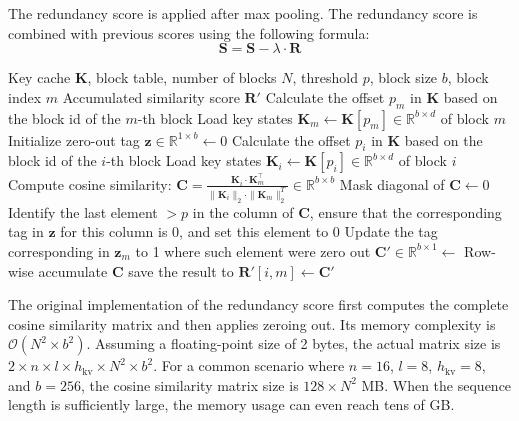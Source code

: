 \documentclass[11pt]{article}
\begin{document}
The redundancy score is applied after max pooling. The redundancy score is combined with previous scores using the following formula:
\begin{equation}
    \mathbf S=\mathbf{S} - \lambda \cdot\mathbf R
\end{equation}



\begin{algorithm}[!ht]
\caption{Flash Redundancy Score}
\label{alg:redundancy}
\begin{algorithmic}[1]
\Require Key cache $\mathbf K$, block table, number of blocks $N$, threshold $p$, block size $b$, block index $m$
\Ensure Accumulated similarity score $\mathbf R'$
\State Calculate the offset $p_m$ in $\mathbf{K}$ based on the block id of the $m$-th block
\State Load key states $\mathbf K_m  \leftarrow \mathbf{K}[p_m]\in \mathbb R^{b \times d}$ of block $m$
\State Initialize zero-out tag $\mathbf z \in \mathbb R^{1 \times b} \gets 0$
    \State Calculate the offset $p_i$ in $\mathbf{K}$ based on the block id of the $i$-th block
    \State Load key states $\mathbf K_i  \leftarrow \mathbf{K}[p_i]\in \mathbb R^{b \times d}$ of block $i$
    \State Compute cosine similarity: $\mathbf C = \frac{\mathbf K_i\cdot\mathbf  K_m^\top}{\|\mathbf K_i\|_2 \cdot \| \mathbf K_m\|_2^T} \in \mathbb R^{b \times b}$
        \State Mask diagonal of $\mathbf C \gets 0$
    \EndIf
    \State Identify the last element \(> p\) in the column of \(\mathbf C\), ensure that the corresponding tag in \(\mathbf{z}\) for this column is \(0\), and set this element to \(0\)
    \State Update the tag corresponding in $\mathbf z_m$ to 1 where such element were zero out
    \State  $\mathbf C' \in \mathbb R^{b\times 1} \leftarrow$ Row-wise accumulate $\mathbf C $ 
    \State save the result to $\mathbf R'[i,m] \leftarrow \mathbf C'$
\EndFor
\end{algorithmic}
\end{algorithm}

The original implementation of the redundancy score first computes the complete cosine similarity matrix and then applies zeroing out. Its memory complexity is $\mathcal{O}(N^2 \times b^2)$. Assuming a floating-point size of 2 bytes, the actual matrix size is $2 \times n \times l \times h_\text{kv} \times N^2 \times b^2$. For a common scenario where $n=16$, $l=8$, $h_\text{kv}=8$, and $b=256$, the cosine similarity matrix size is $128 \times N^2$ MB. When the sequence length is sufficiently large, the memory usage can even reach tens of GB.
\end{document}
